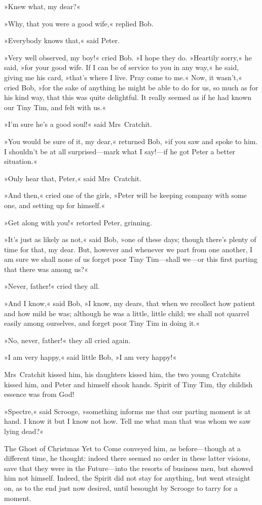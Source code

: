 »Knew what, my dear?«

»Why, that you were a good wife,« replied Bob.

»Everybody knows that,« said Peter.

»Very well observed, my boy!« cried Bob. »I hope they do. »Heartily sorry,« he said, »for your good wife. If I can be of service to you in any way,« he said, giving me his card, »that's where I live. Pray come to me.« Now, it wasn't,« cried Bob, »for the sake of anything he might be able to do for us, so much as for his kind way, that this was quite delightful. It really seemed as if he had known our Tiny Tim, and felt with us.«

»I'm sure he's a good soul!« said Mrs~Cratchit.

»You would be sure of it, my dear,« returned Bob, »if you saw and spoke to him. I shouldn't be at all surprised—mark what I say!—if he got Peter a better situation.«

»Only hear that, Peter,« said Mrs~Cratchit.

»And then,« cried one of the girls, »Peter will be keeping company with some one, and setting up for himself.«

»Get along with you!« retorted Peter, grinning.

»It's just as likely as not,« said Bob, »one of these days; though there's plenty of time for that, my dear. But, however and when\-ever we part from one another, I am sure we shall none of us forget poor Tiny Tim—shall we—or this first parting that there was among us?«

»Never, father!« cried they all.

»And I know,« said Bob, »I know, my dears, that when we recollect how patient and how mild he was; although he was a little, little child; we shall not quarrel easily among ourselves, and forget poor Tiny Tim in doing it.«

»No, never, father!« they all cried again.

»I am very happy,« said little Bob, »I am very happy!«

Mrs~Cratchit kissed him, his daughters kissed him, the two young Cratchits kissed him, and Peter and himself shook hands. Spirit of Tiny Tim, thy childish essence was from God!

»Spectre,« said Scrooge, »something informs me that our parting moment is at hand. I know it but I know not how. Tell me what man that was whom we saw lying dead?«

The Ghost of Christmas Yet to Come conveyed him, as before—though at a different time, he thought: indeed there seemed no order in these latter visions, save that they were in the Future—into the resorts of business men, but showed him not himself. Indeed, the Spirit did not stay for anything, but went straight on, as to the end just now desired, until besought by Scrooge to tarry for a moment.

